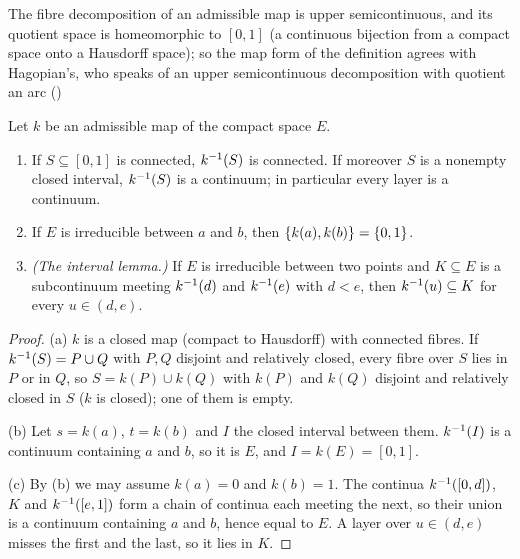 
The fibre decomposition of an admissible map is upper semicontinuous, and its quotient space is
homeomorphic to $[0,1]$ (a continuous bijection from a compact space onto a Hausdorff space); so the map
form of the definition agrees with Hagopian's, who speaks of an upper semicontinuous decomposition with
quotient an arc ()

\begin{lemma}\label{lem:adm-basic}
Let $k$ be an admissible map of the compact space $E$.
\begin{enumerate}[label=(\alph*)]
\item If $S\subseteq[0,1]$ is connected, $k^{-1}(S)$ is connected. If moreover $S$ is a nonempty closed interval,
$k^{-1}(S)$ is a continuum; in particular every layer is a continuum.
\item If $E$ is irreducible between $a$ and $b$, then $\left\{ k(a),k(b) \right\}=\left\{ 0,1 \right\}$.
\item \emph{(The interval lemma.)} If $E$ is irreducible between two points and $K\subseteq E$ is a subcontinuum
meeting $k^{-1}(d)$ and $k^{-1}(e)$ with $d<e$, then $k^{-1}(u)\subseteq K$ for every $u\in(d,e)$.
\end{enumerate}
\end{lemma}

\begin{proof}
(a) $k$ is a closed map (compact to Hausdorff) with connected fibres. If $k^{-1}(S)=P\cup Q$ with $P,Q$
disjoint and relatively closed, every fibre over $S$ lies in $P$ or in $Q$, so $S=k(P)\cup k(Q)$ with $k(P)$
and $k(Q)$ disjoint and relatively closed in $S$ ($k$ is closed); one of them is empty.

(b) Let $s=k(a)$, $t=k(b)$ and $I$ the closed interval between them. $k^{-1}(I)$ is a continuum containing $a$
and $b$, so it is $E$, and $I=k(E)=[0,1]$.

(c) By (b) we may assume $k(a)=0$ and $k(b)=1$. The continua $k^{-1}([0,d])$, $K$ and $k^{-1}([e,1])$ form a chain
of continua each meeting the next, so their union is a continuum containing $a$ and $b$, hence equal to
$E$. A layer over $u\in(d,e)$ misses the first and the last, so it lies in $K$.
\end{proof}


